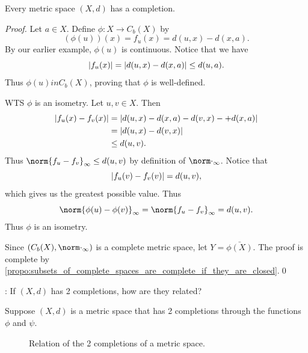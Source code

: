 \documentclass[notoc,notitlepage]{tufte-book}
\begin{document}
\begin{thm}\label{thm:completion_theorem}
  Every metric space $(X, d)$ has a completion.
\end{thm}

\begin{proof}
  Let $a \in X$. Define $\phi : X \to C_b(X)$ by
  \begin{equation*}
    \left( \phi(u) \right)(x) = f_u(x) = d(u, x) - d(x, a).
  \end{equation*}
  By our earlier example, $\phi(u)$ is continuous. Notice that we have
  \begin{equation*}
    \left| f_u(x) \right| = \left| d(u, x) - d(x, a) \right| \leq d(u, a).
  \end{equation*}
  Thus $\phi(u) in C_b(X)$, proving that $\phi$ is well-defined.

  WTS $\phi$ is an isometry. Let $u, v \in X$. Then
  \begin{align*}
    \left| f_u(x) - f_v(x) \right| &= \left| d(u, x) - d(x, a) - d(v, x) - + d(x, a) \right| \\
                            &= \left| d(u, x) - d(v, x) \right| \\
                            &\leq d(u, v).
  \end{align*}
  Thus $\norm{ f_u - f_v }_\infty \leq d(u, v)$ by definition of $\norm\cdot_\infty$. Notice that
  \begin{equation*}
    \left| f_u(v) - f_v(v) \right| = d(u, v),
  \end{equation*}
  which gives us the greatest possible value. Thus
  \begin{equation*}
    \norm{ \phi(u) - \phi(v) }_\infty = \norm{ f_u - f_v }_\infty = d(u, v).
  \end{equation*}
  Thus $\phi$ is an isometry.

  Since $(C_b(X), \norm\cdot_\infty)$ is a complete metric space, let $Y = \bar{\phi(X)}$. The proof is complete by \cref{propo:subsets_of_complete_spaces_are_complete_if_they_are_closed}.\qed\
\end{proof}

: If $(X, d)$ has 2 completions, how are they related?

Suppose $(X, d)$ is a metric space that has 2 completions through the functions $\phi$ and $\psi$.

\begin{figure}[!ht]
  \centering
  \caption{Relation of the 2 completions of a metric space.}
  \label{fig:relation_2_completions_metric_space}
\end{figure}
\end{document}
